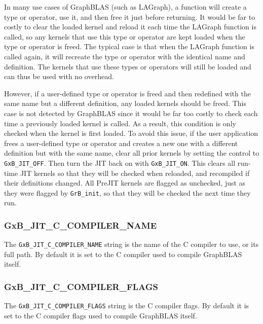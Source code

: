 \documentclass[12pt]{article}
\begin{document}
In many use cases of GraphBLAS (such as LAGraph), a function will create a type
or operator, use it, and then free it just before returning.  It would be far
to costly to clear the loaded kernel and reload it each time the LAGraph
function is called, so any kernels that use this type or operator are kept
loaded when the type or operator is freed.  The typical case is that when the
LAGraph function is called again, it will recreate the type or operator with
the identical name and definition.  The kernels that use these types or
operators will still be loaded and can thus be used with no overhead.

However, if a user-defined type or operator is freed and then redefined with
the same name but a different definition, any loaded kernels should be freed.
This case is not detected by GraphBLAS since it would be far too costly to
check each time a previously loaded kernel is called.  As a result, this
condition is only checked when the kernel is first loaded.  To avoid this
issue, if the user application frees a user-defined type or operator and
creates a new one with a different definition but with the same name, clear all
prior kernels by setting the control to \verb'GxB_JIT_OFF'.  Then turn the JIT
back on with \verb'GxB_JIT_ON'.  This clears all run-time JIT kernels so that
they will be checked when reloaded, and recompiled if their definitions
changed.  All PreJIT kernels are flagged as unchecked, just as they were
flagged by \verb'GrB_init', so that they will be checked the next time they
run.

\subsubsection{\sf GxB\_JIT\_C\_COMPILER\_NAME}

The \verb'GxB_JIT_C_COMPILER_NAME' string is the name of the C compiler to use,
or its full path.
By default it is set to the C compiler used to compile GraphBLAS itself.

\subsubsection{\sf GxB\_JIT\_C\_COMPILER\_FLAGS}

The \verb'GxB_JIT_C_COMPILER_FLAGS' string is the C compiler flags.
By default it is set to the C compiler flags used to compile GraphBLAS itself.
\end{document}
